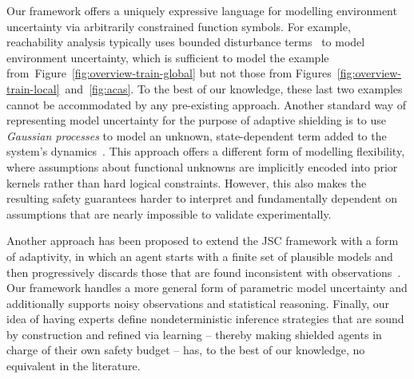 Our framework offers a uniquely expressive language for modelling environment uncertainty via arbitrarily constrained function symbols. For example, reachability analysis typically uses {bounded disturbance terms}~\cite{althoff2014online} to model environment uncertainty, which is sufficient to model the example from~Figure~\ref{fig:overview-train-global} but not those from Figures~\ref{fig:overview-train-local}~and~\ref{fig:acas}. To the best of our knowledge, these last two examples cannot be accommodated by any pre-existing approach. Another standard way of representing model uncertainty for the purpose of adaptive shielding is to use \emph{Gaussian processes} to model an unknown, state-dependent term added to the system's dynamics~\cite{DBLP:conf/aaai/ChengOMB19,DBLP:conf/eucc/BerkenkampS15,DBLP:conf/nips/BerkenkampTS017,DBLP:journals/tac/FisacAZKGT19}. This approach offers a different form of modelling flexibility, where assumptions about functional unknowns are implicitly encoded into prior kernels rather than hard logical constraints. However, this also makes the resulting safety guarantees harder to interpret and fundamentally dependent on assumptions that are nearly impossible to validate experimentally.

Another approach has been proposed to extend the JSC framework with a form of adaptivity, in which an agent starts with a finite set of plausible models and then progressively discards those that are found inconsistent with observations~\cite{DBLP:conf/tacas/FultonP19}. Our framework handles a more general form of parametric model uncertainty and additionally supports noisy observations and statistical reasoning. Finally, our idea of having experts define nondeterministic inference strategies that are sound by construction and refined via learning -- thereby making shielded agents in charge of their own safety budget -- has, to the best of our knowledge, no equivalent in the literature.